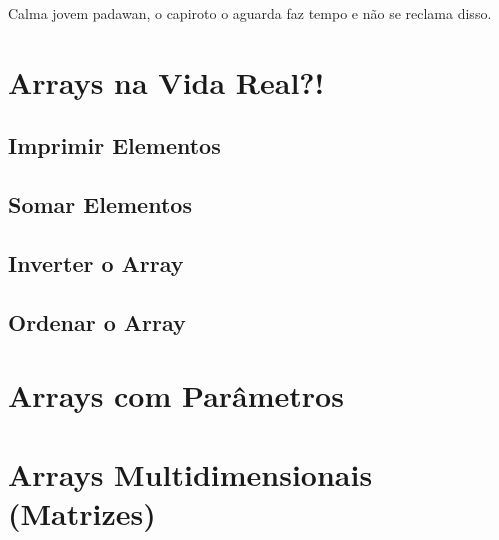 
Calma jovem padawan, o capiroto o aguarda faz tempo e não se reclama disso.


\section{Arrays na Vida Real?!}
\subsection{Imprimir Elementos}
\subsection{Somar Elementos}
\subsection{Inverter o Array}
\subsection{Ordenar o Array}

\section{Arrays com Parâmetros}

\section{Arrays Multidimensionais (Matrizes)}


